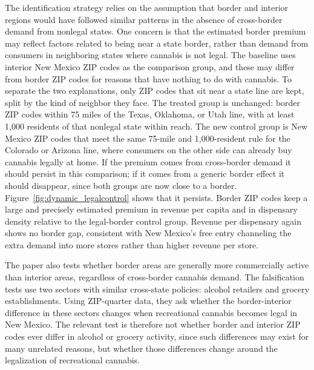 \documentclass[12pt]{article}
\begin{document}
The identification strategy relies on the assumption that border and interior regions would have followed similar patterns in the absence of cross-border demand from nonlegal states. One concern is that the estimated border premium may reflect factors related to being near a state border, rather than demand from consumers in neighboring states where cannabis is not legal.
 The baseline uses interior New Mexico ZIP codes as the comparison group, and these may differ from border ZIP codes for reasons that have nothing to do with cannabis. To separate the two explanations, only ZIP codes that sit near a state line are kept, split by the kind of neighbor they face. The treated group is unchanged: border ZIP codes within 75 miles of the Texas, Oklahoma, or Utah line, with at least 1{,}000 residents of that nonlegal state within reach. The new control group is New Mexico ZIP codes that meet the same 75-mile and 1{,}000-resident rule for the Colorado or Arizona line, where consumers on the other side can already buy cannabis legally at home. If the premium comes from cross-border demand it should persist in this comparison; if it comes from a generic border effect it should disappear, since both groups are now close to a border. Figure~\ref{fig:dynamic_legalcontrol} shows that it persists. Border ZIP codes keep a large and precisely estimated premium in revenue per capita and in dispensary density relative to the legal-border control group. Revenue per dispensary again shows no border gap, consistent with New Mexico's free entry channeling the extra demand into more stores rather than higher revenue per store.

The paper also tests whether border areas are generally more commercially active than interior areas, regardless of cross-border cannabis demand.
 The falsification tests use two sectors with similar cross-state policies: alcohol retailers and grocery establishments. Using ZIP-quarter data, they ask whether the border-interior difference in these sectors changes when recreational cannabis becomes legal in New Mexico. The relevant test is therefore not whether border and interior ZIP codes ever differ in alcohol or grocery activity, since such differences may exist for many unrelated reasons, but whether those differences change around the legalization of recreational cannabis.
\end{document}
